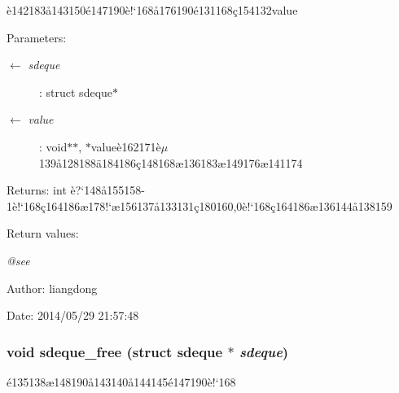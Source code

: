 \`{e}142183\aa{}143150\'{e}147190\`{e}!`168\aa{}176190\'{e}131168\c{c}154132value 

\begin{Desc}
\item[Parameters:]
\begin{description}
\item[\mbox{$\leftarrow$} {\em sdeque}]: struct sdeque$\ast$ \item[\mbox{$\leftarrow$} {\em value}]: void$\ast$$\ast$, $\ast$value\`{e}162171\`{e}$\mu$139\aa{}128188\"{a}184186\c{c}148168\ae{}136183\ae{}149176\ae{}141174 \end{description}
\end{Desc}
\begin{Desc}
\item[Returns:]int \`{e}?`148\aa{}155158-1\`{e}!`168\c{c}164186\ae{}178!`\ae{}156137\aa{}133131\c{c}180160,0\`{e}!`168\c{c}164186\ae{}136144\aa{}138159 \end{Desc}
\begin{Desc}
\item[Return values:]
\begin{description}
\item[{\em @see}]\end{description}
\end{Desc}
\begin{Desc}
\item[Author:]liangdong \end{Desc}
\begin{Desc}
\item[Date:]2014/05/29 21:57:48 \end{Desc}
\subsubsection{\setlength{\rightskip}{0pt plus 5cm}void sdeque\_\-free (struct sdeque $\ast$ {\em sdeque})}\label{sdeque_8h_a1}


\'{e}135138\ae{}148190\aa{}143140\aa{}144145\'{e}147190\`{e}!`168 

